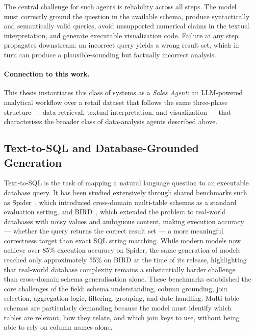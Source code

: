 The central challenge for such agents is reliability across all steps.
The model must correctly ground the question in the available schema, produce
syntactically and semantically valid queries, avoid unsupported numerical claims
in the textual interpretation, and generate executable visualization code.
Failure at any step propagates downstream: an incorrect query yields a wrong
result set, which in turn can produce a plausible-sounding but factually
incorrect analysis.

\paragraph{Connection to this work.}
This thesis instantiates this class of systems as a \textit{Sales Agent}:
an LLM-powered analytical workflow over a retail dataset that follows the
same three-phase structure --- data retrieval, textual interpretation, and
visualization --- that characterises the broader class of data-analysis agents
described above.

\subsection{Text-to-SQL and Database-Grounded Generation}\label{sec:text2SQL}

Text-to-SQL is the task of mapping a natural language question to an executable
database query.
It has been studied extensively through shared benchmarks such as
Spider~\cite{yu2018spider}, which introduced cross-domain multi-table schemas
as a standard evaluation setting, and BIRD~\cite{li2024bird}, which extended
the problem to real-world databases with noisy values and ambiguous content,
making execution accuracy --- whether the query returns the correct result
set --- a more meaningful correctness target than exact SQL string matching.
While modern models now achieve over 85\% execution accuracy on Spider,
the same generation of models reached only approximately 55\% on BIRD at the
time of its release, highlighting that real-world database complexity remains
a substantially harder challenge than cross-domain schema generalisation alone.
These benchmarks established the core challenges of the field: schema
understanding, column grounding, join selection, aggregation logic, filtering,
grouping, and date handling.
Multi-table schemas are particularly demanding because the model must identify
which tables are relevant, how they relate, and which join keys to use, without
being able to rely on column names alone.

